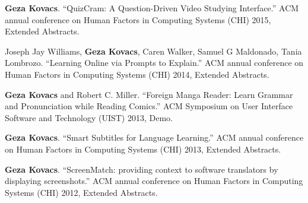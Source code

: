 \documentclass[margin,line]{resume}
\begin{document}
\begin{resume}
\textbf{Geza Kovacs}. ``QuizCram: A Question-Driven Video Studying Interface.'' ACM annual conference on Human Factors in Computing Systems (CHI) 2015, Extended Abstracts.

Joseph Jay Williams, \textbf{Geza Kovacs}, Caren Walker, Samuel G Maldonado, Tania Lombrozo. ``Learning Online via Prompts to Explain.'' ACM annual conference on Human Factors in Computing Systems (CHI) 2014, Extended Abstracts.

\textbf{Geza Kovacs} and Robert C. Miller. ``Foreign Manga Reader: Learn Grammar and Pronunciation while Reading Comics.'' ACM Symposium on User Interface Software and Technology (UIST) 2013, Demo.

\textbf{Geza Kovacs}. ``Smart Subtitles for Language Learning.'' ACM annual conference on Human Factors in Computing Systems (CHI) 2013, Extended Abstracts.%

\textbf{Geza Kovacs}. ``ScreenMatch: providing context to software translators by displaying screenshots.'' ACM annual conference on Human Factors in Computing Systems (CHI) 2012, Extended Abstracts.%


\end{resume}
\end{document}
